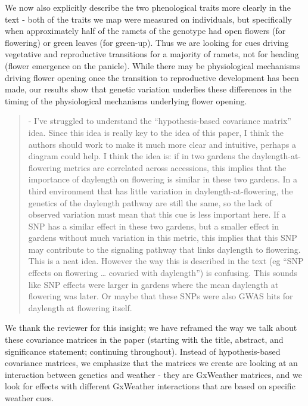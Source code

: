 \documentclass[
  letterpaper,
  DIV=11,
  numbers=noendperiod]{scrartcl}
\begin{document}
We now also explicitly describe the two phenological traits more clearly
in the text - both of the traits we map were measured on individuals,
but specifically when approximately half of the ramets of the genotype
had open flowers (for flowering) or green leaves (for green-up). Thus we
are looking for cues driving vegetative and reproductive transitions for
a majority of ramets, not for heading (flower emergence on the panicle).
While there may be physiological mechanisms driving flower opening once
the transition to reproductive development has been made, our results
show that genetic variation underlies these differences in the timing of
the physiological mechanisms underlying flower opening.

\begin{quote}
\begin{tcolorbox}[enhanced jigsaw, colframe=quarto-callout-warning-color-frame, rightrule=.15mm, leftrule=.75mm, left=2mm, breakable, toprule=.15mm, arc=.35mm, bottomrule=.15mm, opacityback=0, colback=white]

- I've struggled to understand the ``hypothesis-based covariance
matrix'' idea. Since this idea is really key to the idea of this paper,
I think the authors should work to make it much more clear and
intuitive, perhaps a diagram could help. I think the idea is: if in two
gardens the daylength-at-flowering metrics are correlated across
accessions, this implies that the importance of daylength on flowering
is similar in these two gardens. In a third environment that has little
variation in daylength-at-flowering, the genetics of the daylength
pathway are still the same, so the lack of observed variation must mean
that this cue is less important here. If a SNP has a similar effect in
these two gardens, but a smaller effect in gardens without much
variation in this metric, this implies that this SNP may contribute to
the signaling pathway that links daylength to flowering. This is a neat
idea. However the way this is described in the text (eg ``SNP effects on
flowering \ldots{} covaried with daylength'') is confusing. This sounds
like SNP effects were larger in gardens where the mean daylength at
flowering was later. Or maybe that these SNPs were also GWAS hits for
daylength at flowering itself.

\end{tcolorbox}
\end{quote}

We thank the reviewer for this insight; we have reframed the way we talk
about these covariance matrices in the paper (starting with the title,
abstract, and significance statement; continuing throughout). Instead of
hypothesis-based covariance matrices, we emphasize that the matrices we
create are looking at an interaction between genetics and weather - they
are GxWeather matrices, and we look for effects with different GxWeather
interactions that are based on specific weather cues.
\end{document}
